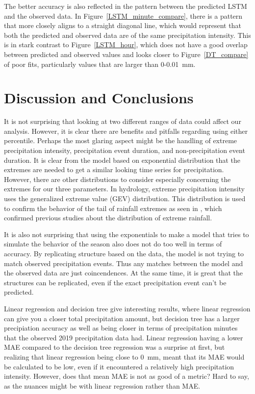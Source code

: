 \documentclass[11pt]{report}
\begin{document}
The better accuracy is also reflected in the pattern between the predicted LSTM and the observed data. In Figure~\ref{LSTM_minute_compare}, there is a pattern that more closely aligns to a straight diagonal line, which would represent that both the predicted and observed data are of the same precipitation intensity. This is in stark contrast to Figure~\ref{LSTM_hour}, which does not have a good overlap between predicted and observed values and looks closer to Figure~\ref{DT_compare} of poor fits, particularly values that are larger than 0-0.01~mm. 
\clearpage


\section{Discussion and Conclusions}\label{sec:conclusions}


It is not surprising that looking at two different ranges of data could
affect our analysis. However, it is clear there are benefits and pitfalls
regarding using either percentile. Perhaps the most glaring aspect might
be the handling of extreme precipitation intensity, precipitation event
duration, and non-precipitation event duration. It is clear from the
model based on exponential distribution that the extremes are needed to
get a similar looking time series for precipitation. However, there are
other distributions to consider especially concerning the extremes for
our three parameters. In hydrology,  extreme precipitation intensity uses 
the generalized extreme value (GEV) distribution. This distribution is 
used to confirm the behavior of the tail of rainfall extremes as seen 
in \cite[]{Hydro_dist}, which confirmed previous studies about the 
distribution of extreme rainfall.  

It is also not surprising that using the exponentials to make a model 
that tries to simulate the behavior of the season also does not do too 
well in terms of accuracy. By replicating structure based on the data, 
the model is not trying to match observed precipitation events. 
Thus any matches between the model and the observed data are just 
coincendences. At the same time, it is great that the structures can be
replicated, even if the exact precipitation event can't be predicted. 

Linear regression and decision tree give interesting results, where linear regression can give you a closer total precipitation amount, but decision tree has a larger precipiation accuracy as well as being closer in terms of precipitation minutes that the observed 2019 precipitation data had. Linear regression having a lower MAE compared to the decision tree regression was a surprise at first, but realizing that linear regression being close to 0~mm, meant that its MAE would be calculated to be low, even if it encountered a relatively high precipitation intensity. However, does that mean MAE is not as good of a metric? Hard to say, as the nuances might be with linear regression rather than MAE. 
\end{document}
